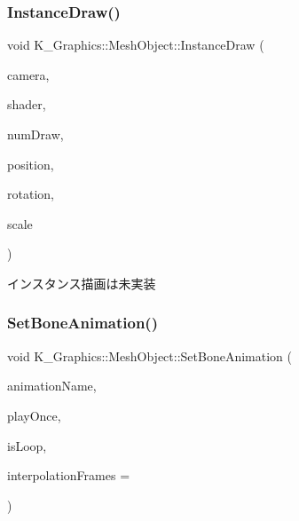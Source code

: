 \subsubsection{\texorpdfstring{Instance\+Draw()}{InstanceDraw()}}
{\footnotesize\ttfamily void K\+\_\+\+Graphics\+::\+Mesh\+Object\+::\+Instance\+Draw (\begin{DoxyParamCaption}\item[{\mbox{\hyperlink{class_k___graphics_1_1_camera_class}{Camera\+Class}} $\ast$}]{camera,  }\item[{\mbox{\hyperlink{class_k___graphics_1_1_shader_class}{Shader\+Class}} $\ast$}]{shader,  }\item[{int}]{num\+Draw,  }\item[{const \mbox{\hyperlink{namespace_k___math_a66884d78082c39ada4091c211f3570f8}{K\+\_\+\+Math\+::\+Vector3}} \&}]{position,  }\item[{const \mbox{\hyperlink{namespace_k___math_a66884d78082c39ada4091c211f3570f8}{K\+\_\+\+Math\+::\+Vector3}} \&}]{rotation,  }\item[{const \mbox{\hyperlink{namespace_k___math_a66884d78082c39ada4091c211f3570f8}{K\+\_\+\+Math\+::\+Vector3}} \&}]{scale }\end{DoxyParamCaption})}



インスタンス描画は未実装 

\mbox{\label{class_k___graphics_1_1_mesh_object_a53fca52d8b8b1abb8d91f666f97bb9ea}} 
\subsubsection{\texorpdfstring{Set\+Bone\+Animation()}{SetBoneAnimation()}}
{\footnotesize\ttfamily void K\+\_\+\+Graphics\+::\+Mesh\+Object\+::\+Set\+Bone\+Animation (\begin{DoxyParamCaption}\item[{const std\+::string \&}]{animation\+Name,  }\item[{bool}]{play\+Once,  }\item[{bool}]{is\+Loop,  }\item[{int}]{interpolation\+Frames = {} }\end{DoxyParamCaption})}




